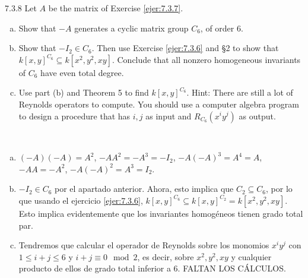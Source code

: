 \documentclass[twoside]{article}
\begin{document}
\begin{ejercicio}{7.3.8}
Let $A$ be the matrix of Exercise \ref{ejer:7.3.7}.
\begin{enumerate}[a.]
\item Show that $−A$ generates a cyclic matrix group $C_6$, of order 6.
\item Show that $−I_2 ∈ C_6$. Then use Exercise \ref{ejer:7.3.6} and §2 to show that $k[x, y]^{C_6} ⊆ k[x^2, y^2, xy]$.
Conclude that all nonzero homogeneous invariants of $C_6$ have even total degree.
\item Use part (b) and Theorem 5 to find $k[x, y]^{C_6}$. Hint: There are still a lot of Reynolds
operators to compute. You should use a computer algebra program to design a procedure
that has $i, j$ as input and $R_{C_6} (x^iy^j)$ as output.
\end{enumerate}
\end{ejercicio}
\begin{solucion}\
\begin{enumerate}[a.]
\item $(-A)(-A)=A^2$, $-AA^2=-A^3=-I_2$, $-A(-A)^3=A^4=A$, $-AA=-A^2$, $-A(-A)^2=A^3=I_2$. 
\item $-I_2\in C_6$ por el apartado anterior. Ahora, esto implica que $C_2\subseteq C_6$, por lo que usando el ejercicio \ref{ejer:7.3.6}, $k[x, y]^{C_6} ⊆ k[x,y]^{C_2}=k[x^2, y^2, xy]$. Esto implica evidentemente que los invariantes homogéneos tienen grado total par.
\item Tendremos que calcular el operador de Reynolds sobre los monomios $x^iy^j$ con $1\leq i+j\leq 6$ y $i+j\equiv 0\mod 2$, es decir, sobre $x^2,y^2,xy$ y cualquier producto de ellos de grado total inferior a 6. FALTAN LOS CÁLCULOS.
\end{enumerate}
\end{solucion}

\newpage
\end{document}
